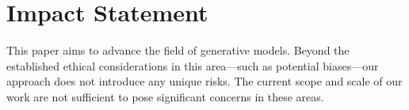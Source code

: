\section*{Impact Statement}
This paper aims to advance the field of generative models. Beyond the established ethical considerations in this area—such as potential biases—our approach does not introduce any unique risks. The current scope and scale of our work are not sufficient to pose significant concerns in these areas.